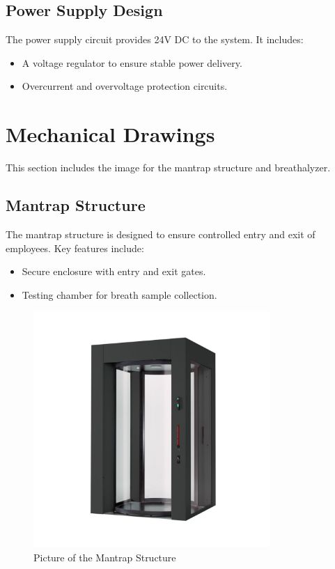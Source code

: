 \subsection{Power Supply Design}
The power supply circuit provides 24V DC to the system. It includes:
\begin{itemize}
    \item A voltage regulator to ensure stable power delivery.
    \item Overcurrent and overvoltage protection circuits.
\end{itemize}

\section{Mechanical Drawings}
\label{app:mechanical_drawings}

This section includes the image for the mantrap structure and breathalyzer.


\subsection{Mantrap Structure}
The mantrap structure is designed to ensure controlled entry and exit of employees. Key features include:
\begin{itemize}
    \item Secure enclosure with entry and exit gates.
    \item Testing chamber for breath sample collection.
\end{itemize}

\begin{figure}[H]
    \centering
    \includegraphics[width=0.8\textwidth]{images/mantrap_drawing.png}
    \caption{Picture of the Mantrap Structure}
    \label{fig:mantrap_drawing}
\end{figure}

